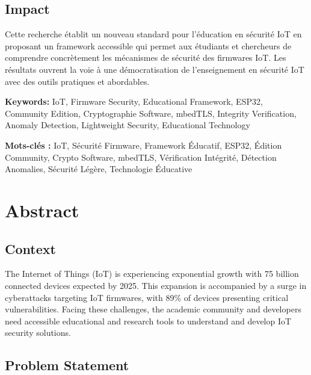 \section*{Impact}

Cette recherche établit un nouveau standard pour l'éducation en sécurité IoT en proposant un framework accessible qui permet aux étudiants et chercheurs de comprendre concrètement les mécanismes de sécurité des firmwares IoT. Les résultats ouvrent la voie à une démocratisation de l'enseignement en sécurité IoT avec des outils pratiques et abordables.

\textbf{Keywords:} IoT, Firmware Security, Educational Framework, ESP32, Community Edition, Cryptographie Software, mbedTLS, Integrity Verification, Anomaly Detection, Lightweight Security, Educational Technology

\vfill

\begin{center}
\textbf{Mots-clés :} IoT, Sécurité Firmware, Framework Éducatif, ESP32, Édition Community, Crypto Software, mbedTLS, Vérification Intégrité, Détection Anomalies, Sécurité Légère, Technologie Éducative
\end{center}


\chapter*{Abstract}

\section*{Context}

The Internet of Things (IoT) is experiencing exponential growth with 75 billion connected devices expected by 2025. This expansion is accompanied by a surge in cyberattacks targeting IoT firmwares, with 89\% of devices presenting critical vulnerabilities. Facing these challenges, the academic community and developers need accessible educational and research tools to understand and develop IoT security solutions.

\section*{Problem Statement}

